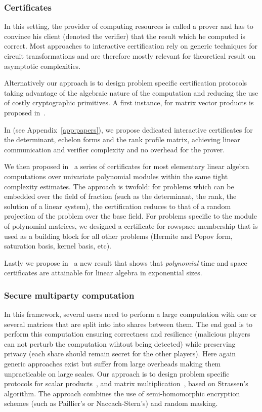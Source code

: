 \documentclass{deliverablereport}
\begin{document}
\subsubsection{Certificates}

In this setting, the provider of computing resources is called a
prover and has to
convince his client (denoted the verifier) that the result which he computed is
correct.
Most approaches to interactive certification rely on generic techniques for
circuit transformations and are therefore mostly relevant for theoretical result
on asymptotic complexities. 

Alternatively our approach is to design problem specific certification protocols
taking advantage of the algebraic nature of the computation and
reducing the use of costly
cryptographic primitives. A first instance, for matrix vector products is
proposed in~\cite{DuZu17}.

In \cite{DLP17} (see Appendix~\ref{app:papers}), we propose dedicated interactive
certificates for the determinant, echelon forms and the rank profile matrix,
achieving linear communication and verifier complexity and no overhead for the prover.

We then proposed in~\cite{LNPRR18}  a series of certificates for most
elementary linear algebra computations over univariate polynomial modules within
the same tight complexity estimates. The approach is twofold: for problems which
can be embedded over the field of fraction (such as the determinant, the rank,
the solution of a linear system), the certification reduces to that of a random
projection of the problem over the base field. For problems specific to the
module of polynomial matrices, we designed a certificate for rowspace membership
that is used as a building block for all other problems (Hermite and Popov form,
saturation basis, kernel basis, etc).

Lastly we propose in~\cite{DKVZ17} a new result that shows that 
{\em polynomial} time and space certificates are attainable for linear
algebra in exponential sizes. 

\subsubsection{Secure multiparty computation}

In this framework, several users need to perform a large computation with one or several
matrices that are split into into shares between them. The end goal is to
perform this computation ensuring correctness and resilience (malicious players
can not perturb the computation wihtout being detected) while preserving privacy (each
share should remain secret for the other players).
Here again generic approaches exist but suffer from large overheads making them
unpracticable on large scales.
Our approach is to design problem specific protocols for scalar
products~\cite{DLOP17}, and matrix multiplication~\cite{DFLLOPP18}, based on
Strassen's algorithm. The approach combines the use of semi-homomorphic
encryption schemes (such as Paillier's or Naccach-Stern's) and random masking.
\end{document}
